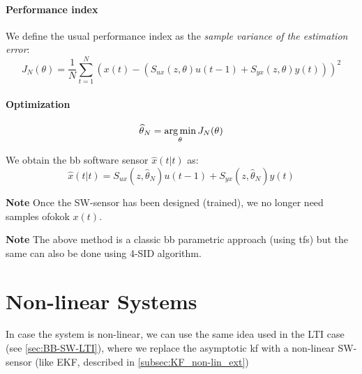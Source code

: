 \paragraph{Performance index}
We define the usual performance index as the \emph{sample variance of the estimation error}: 
\[
    J_N(\theta) = \frac{1}{N}\sum_{t=1}^N \left( x(t) - (S_{ux}(z, \theta) u(t-1) + S_{yx}(z,\theta)y(t)) \right)^2
\]

\paragraph{Optimization}
\[
    \widehat{\theta}_N = \operatorname*{arg\,min}_\theta J_N(\theta)
\]

We obtain the \acrlong{bb} software sensor $\hat{x}(t|t)$ as: 
\[
	\hat{x}(t|t) = S_{ux}(z, \hat{\theta}_N) u(t-1) + S_{yx}(z,\hat{\theta}_N)y(t)
\]


\textbf{Note} Once the SW-sensor has been designed (trained), we no longer need samples ofokok $x(t)$.

\textbf{Note} The above method is a classic \gls{bb} parametric approach (using \gls{tf}s) but the same can also be done using 4-SID algorithm.


\section{Non-linear Systems}

In case the system is non-linear, we can use the same idea used in the LTI case (see \ref{sec:BB-SW-LTI}), where we replace the asymptotic \gls{kf} with a non-linear SW-sensor (like EKF, described in \ref{subsec:KF_non-lin_ext})

\begin{figure}[H]
    \centering
\end{figure}

